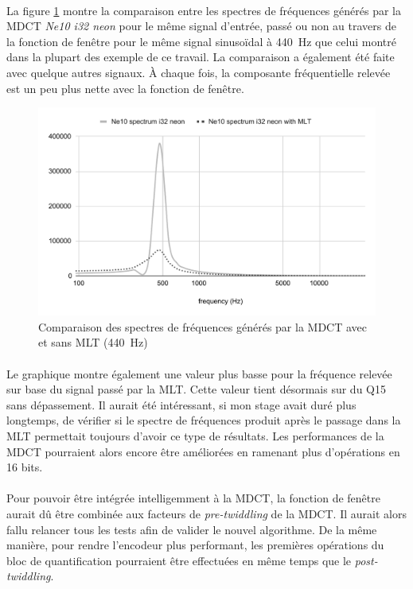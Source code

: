 \documentclass{article}
\begin{document}
    \paragraph{}
    La figure \ref{fig:spectre_mlt} montre la comparaison entre les spectres de fréquences générés par la MDCT \emph{Ne10 i32 neon} pour le même signal d'entrée, passé ou non au travers de la fonction de fenêtre pour le même signal sinusoïdal à \SI{440}{\hertz} que celui montré dans la plupart des exemple de ce travail. La comparaison a également été faite avec quelque autres signaux. À chaque fois, la composante fréquentielle relevée est un peu plus nette avec la fonction de fenêtre.
    \begin{figure}[H]
        \centering
        \includegraphics[width=.8\linewidth]{./images/validation_ne10_i32_neon_mlt.pdf}
        \caption{Comparaison des spectres de fréquences générés par la MDCT avec et sans MLT (\SI{440}{\hertz})}
        \label{fig:spectre_mlt}
    \end{figure}

    \paragraph{}
    Le graphique montre également une valeur plus basse pour la fréquence relevée sur base du signal passé par la MLT. Cette valeur tient désormais sur du Q15 sans dépassement. Il aurait été intéressant, si mon stage avait duré plus longtemps, de vérifier si le spectre de fréquences produit après le passage dans la MLT permettait toujours d'avoir ce type de résultats. Les performances de la MDCT pourraient alors encore être améliorées en ramenant plus d'opérations en 16 bits.

    \paragraph{}
    Pour pouvoir être intégrée intelligemment à la MDCT, la fonction de fenêtre aurait dû être combinée aux facteurs de \emph{pre-twiddling} de la MDCT. Il aurait alors fallu relancer tous les tests afin de valider le nouvel algorithme. De la même manière, pour rendre l'encodeur plus performant, les premières opérations du bloc de quantification pourraient être effectuées en même temps que le \emph{post-twiddling}.
\end{document}
